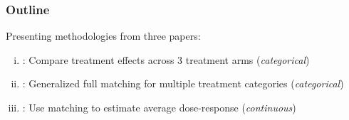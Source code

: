 
\begin{frame}
  \frametitle{Outline}

  Presenting methodologies from three papers: \bigskip 

  \begin{enumerate}[(i)]
  \item \cite{nattino2019}: Compare treatment effects across 3
    treatment arms (\textit{categorical}) \medskip
  \item \cite{svje2017}: Generalized full matching for multiple
    treatment categories (\textit{categorical}) \medskip
  \item \cite{wu2020matching}: Use matching to estimate average
    dose-response (\textit{continuous})
  \end{enumerate}
  
\end{frame}



  
  



